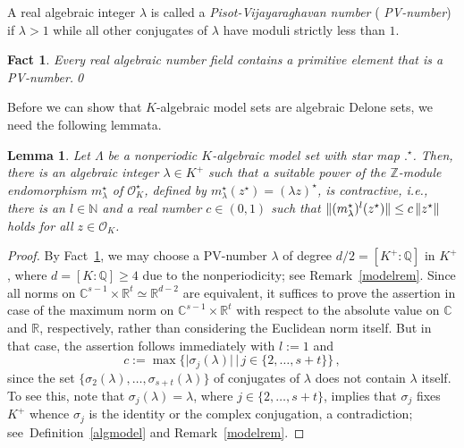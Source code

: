 \documentclass[a4paper]{amsart}
\newtheorem{lem}[theorem]{Lemma}
\newtheorem{fact}[theorem]{Fact}
\theoremstyle{definition}
\numberwithin{equation}{section}
\numberwithin{theorem}{section}
\begin{document}
A real algebraic integer $\lambda$ is called a {\em Pisot-Vijayaraghavan number} ({\em
  PV-number}\/) if $\lambda>1$ while all other conjugates of
$\lambda$ have moduli strictly less than $1$. 

\begin{fact}\cite[Ch.~1, Thm.~ 2]{Sa}\label{pisot}
Every real algebraic number field contains a primitive element that is
a PV-number.\qed
\end{fact}

Before we can show that $K$-algebraic model sets are
algebraic Delone sets, we need the following lemmata. 

\begin{lem}\label{r2}
Let $\varLambda$ be a nonperiodic $K$-algebraic model set
with star map $.^{\star}$. Then,  there is an algebraic integer
$\lambda\in K^+$ such that a suitable power of the ${\mathbb{Z}}$-module 
endomorphism $m_{\lambda}^{\star}$ of $\mathcal{O}_K^{\star}$,
defined by $m_{\lambda}^{\star}(z^{\star})=(\lambda z)^{\star}$,  
is contractive, i.e., there is an $l\in{\mathbb{N}}$ and a real number 
$c \in (0,1)$ such that $\Arrowvert (m_{\lambda}^{\star})^l(z^{\star})\Arrowvert\leq c\, \Arrowvert z^{\star}\Arrowvert$ holds for all $z\in \mathcal{O}_{K}$.
\end{lem}
\begin{proof} 
By Fact~\ref{pisot}, we may choose a
PV-number $\lambda$ of degree $d/2=[K^+:{\mathbb{Q}}]$ in
$K^+$, where $d=[K:{\mathbb{Q}}]\geq 4$ due to the
nonperiodicity; see Remark~\ref{modelrem}. Since all norms on
${\mathbb{C}}^{s-1}\times{\mathbb{R}}^t \simeq {\mathbb{R}}^{d-2}$ are equivalent, it suffices to prove the
assertion in case of the maximum norm on ${\mathbb{C}}^{s-1}\times{\mathbb{R}}^t$ with
respect to the absolute value on ${\mathbb{C}}$ and ${\mathbb{R}}$, respectively, rather than considering the Euclidean norm itself. But in that case, the assertion
follows immediately with $l:=1$ and $$c:=\operatorname{max}\big\{\lvert \sigma_{j}(\lambda)\rvert\,\big|
\, j\in\{2,\dots,s+t\}\big\}\,,$$ since the set
$\{\sigma_{2}(\lambda),\dots,\sigma_{s+t}(\lambda)\}$
of 
conjugates of $\lambda$ does not contain $\lambda$ itself. To see this, note
that $\sigma_j(\lambda)=\lambda$, where $j\in\{2,\dots,s+t\}$, implies
that $\sigma_j$ fixes $K^+$ whence $\sigma_j$  is the identity
or the complex conjugation, a contradiction; see~Definition~\ref{algmodel} and Remark~\ref{modelrem}. 
\end{proof}
\end{document}
